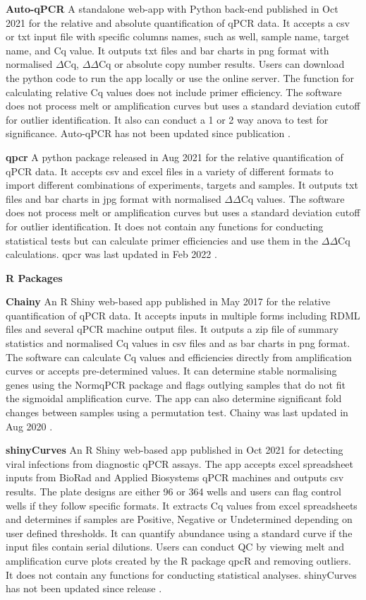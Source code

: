 \documentclass[../main.tex]{subfiles}
\begin{document}
\textbf{Auto-qPCR} A standalone web-app with Python back-end published in Oct 2021 for the relative and absolute quantification of qPCR data. 
It accepts a csv or txt input file with specific columns names, such as well, sample name, target name, and Cq value. 
It outputs txt files and bar charts in png format with normalised $\Delta$Cq, $\Delta\Delta$Cq or absolute copy number results. 
Users can download the python code to run the app locally or use the online server. 
The function for calculating relative Cq values does not include primer efficiency. 
The software does not process melt or amplification curves but uses a standard deviation cutoff for outlier identification. 
It also can conduct a 1 or 2 way anova to test for significance. Auto-qPCR has not been updated since publication \parencite{Maussion2021}.

\textbf{qpcr}
A python package released in Aug 2021 for the relative quantification of qPCR data. 
It accepts csv and excel files in a variety of different formats to import different combinations of experiments, targets and samples. 
It outputs txt files and bar charts in jpg format with normalised $\Delta\Delta$Cq values. The software does not process melt or amplification curves but uses a standard deviation cutoff for outlier identification. 
It does not contain any functions for conducting statistical tests but can calculate primer efficiencies and use them in the $\Delta\Delta$Cq calculations. 
qpcr was last updated in Feb 2022 \parencite{Kleinschmidt2022}.

\textbf{R Packages}

\textbf{Chainy} An R Shiny web-based app published in May 2017 for the relative quantification of qPCR data. 
It accepts inputs in multiple forms including RDML files and several qPCR machine output files. 
It outputs a zip file of summary statistics and normalised Cq values in csv files and as bar charts in png format. 
The software can calculate Cq values and efficiencies directly from amplification curves or accepts pre-determined values. 
It can determine stable normalising genes using the NormqPCR package and flags outlying samples that do not fit the sigmoidal amplification curve. 
The app can also determine significant fold changes between samples using a permutation test. 
Chainy was last updated in Aug 2020 \parencite{Mallona2017}.

\textbf{shinyCurves} An R Shiny web-based app published in Oct 2021 for detecting viral infections from diagnostic qPCR assays. 
The app accepts excel spreadsheet inputs from BioRad and Applied Biosystems qPCR machines and outputs csv results. 
The plate designs are either 96 or 364 wells and users can flag control wells if they follow specific formats. 
It extracts Cq values from excel spreadsheets and determines if samples are Positive, Negative or Undetermined depending on user defined thresholds. 
It can quantify abundance using a standard curve if the input files contain serial dilutions. 
Users can conduct QC by viewing melt and amplification curve plots created by the R package qpcR and removing outliers.  
It does not contain any functions for conducting statistical analyses. shinyCurves has not been updated since release \parencite{OlaecheaLazaro2021}.
\end{document}
